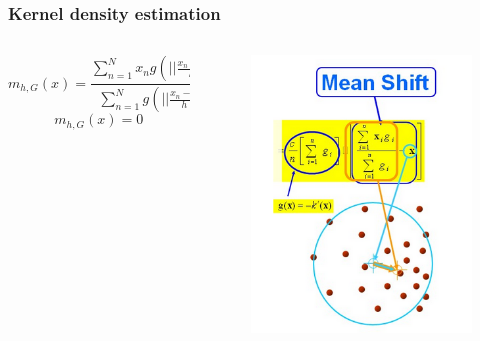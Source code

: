 \documentclass[notheorems,serif,table,compress]{beamer}  %
\begin{document}
\begin{frame}
\frametitle{Kernel density estimation}
\begin{columns}
        \begin{column}{0.55\linewidth}
          \begin{displaymath}
            m_{h,G}(x)=\frac{\sum_{n=1}^{N}x_{n}g(||\frac{x_{n}-x}{h}||^{2})}{\sum_{n=1}^{N}g(||\frac{x_{n}-x}{h}||^{2})}-x
          \end{displaymath}
          \begin{displaymath}
          m_{h,G}(x)=0
          \end{displaymath}
        \end{column}
        \begin{column}{0.45\linewidth}
         \begin{figure}
         \includegraphics[width=0.8\linewidth]{tu.png} 
         \end{figure}
        \end{column}
    \end{columns}\vspace{1ex}
\end{frame}
\end{document}
